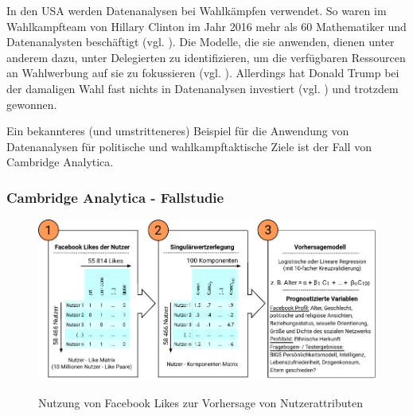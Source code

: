 In den USA werden Datenanalysen bei Wahlkämpfen verwendet. So waren im Wahlkampfteam von
Hillary Clinton im Jahr 2016 mehr als 60 Mathematiker und Datenanalysten beschäftigt (vgl. \cite{Goldmacher}). 
Die Modelle, die sie anwenden, dienen unter anderem dazu, \grqq{} unter Delegierten zu identifizieren,
um die verfügbaren Ressourcen an Wahlwerbung auf sie zu fokussieren (vgl. \cite{Goldmacher}). Allerdings hat Donald Trump bei der damaligen Wahl
fast nichts in Datenanalysen investiert (vgl. \cite{Goldmacher}) und trotzdem gewonnen.

Ein bekannteres (und umstritteneres) Beispiel für die Anwendung von Datenanalysen
für politische und wahlkampftaktische Ziele ist der Fall von Cambridge Analytica.

\subsubsection{Cambridge Analytica - Fallstudie}

\begin{figure}%
\centering
\caption{Nutzung von Facebook Likes zur Vorhersage von Nutzerattributen}
\includegraphics[scale=1.0]{Grafiken/Facebook_Likes_Ink.pdf} 
\label{pic:Like_Matrix}
\end{figure}

